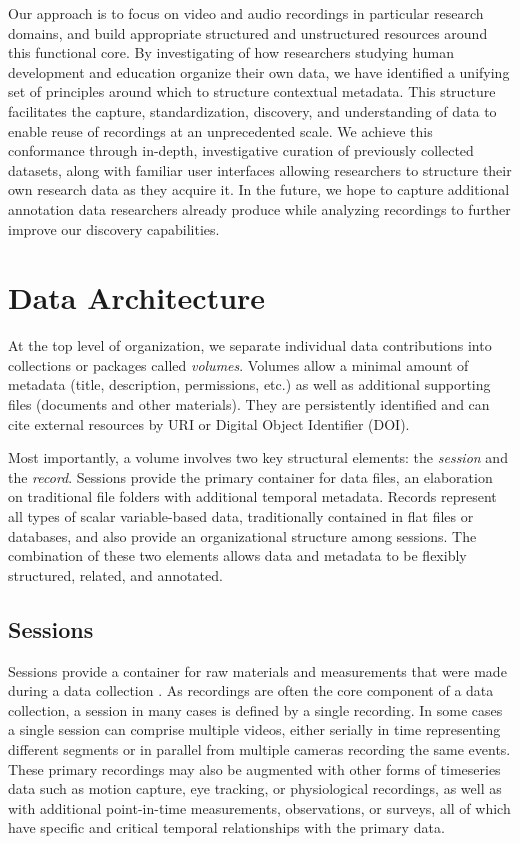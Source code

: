 \documentclass{sig-alternate}
\begin{document}
Our approach is to focus on video and audio recordings in particular research domains, and build appropriate structured and unstructured resources around this functional core.
By investigating of how researchers studying human development and education organize their own data, we have identified a unifying set of principles around which to structure contextual metadata.
This structure facilitates the capture, standardization, discovery, and understanding of data to enable reuse of recordings at an unprecedented scale.
We achieve this conformance through in-depth, investigative curation of previously collected datasets, along with familiar user interfaces allowing researchers to structure their own research data as they acquire it.
In the future, we hope to capture additional annotation data researchers already produce while analyzing recordings to further improve our discovery capabilities.

\section{Data Architecture}

At the top level of organization, we separate individual data contributions into collections or packages called \emph{volumes}.
Volumes allow a minimal amount of metadata (title, description, permissions, etc.) as well as additional supporting files (documents and other materials).
They are persistently identified and can cite external resources by URI or Digital Object Identifier (DOI).

Most importantly, a volume involves two key structural elements: the \emph{session} and the \emph{record}.
Sessions provide the primary container for data files, an elaboration on traditional file folders with additional temporal metadata.
Records represent all types of scalar variable-based data, traditionally contained in flat files or databases, and also provide an organizational structure among sessions.
The combination of these two elements allows data and metadata to be flexibly structured, related, and annotated.

\subsection{Sessions}

Sessions provide a container for raw materials and measurements that were made during a data collection \cite{Bakeman_2012}.
As recordings are often the core component of a data collection, a session in many cases is defined by a single recording.
In some cases a single session can comprise multiple videos, either serially in time representing different segments or in parallel from multiple cameras recording the same events.
These primary recordings may also be augmented with other forms of timeseries data such as motion capture, eye tracking, or physiological recordings, as well as with additional point-in-time measurements, observations, or surveys, all of which have specific and critical temporal relationships with the primary data.
\end{document}
